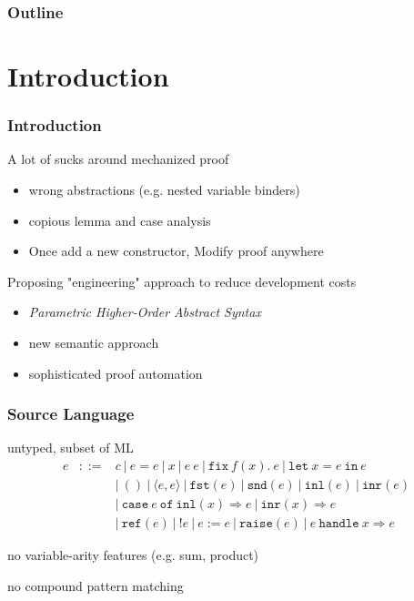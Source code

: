 \documentclass[dvipdfmx,cjk,xcolor=dvipsnames,envcountsect,notheorems,aspectratio=169]{beamer}
\theoremstyle{definition}
\newcommand{\FIX}{\texttt{fix}}
\newcommand{\LET}{\texttt{let}}
\newcommand{\IN}{\texttt{in}}
\newcommand{\FST}{\texttt{fst}}
\newcommand{\SND}{\texttt{snd}}
\newcommand{\INL}{\texttt{inl}}
\newcommand{\INR}{\texttt{inr}}
\newcommand{\CASE}{\texttt{case}}
\newcommand{\OF}{\texttt{of}}
\newcommand{\REF}{\texttt{ref}}
\newcommand{\RAISE}{\texttt{raise}}
\newcommand{\HANDLE}{\texttt{handle}}
\begin{document}
\begin{frame}
  \frametitle{Outline}
  \tableofcontents[sectionstyle=show,subsectionstyle=hide]
\end{frame}

\section{Introduction}

\begin{frame}
	\frametitle{Introduction}
	\LARGE A lot of sucks around mechanized proof
	\begin{itemize}
		\item wrong abstractions (e.g. nested variable binders)
		\item copious lemma and case analysis
		\item Once add a new constructor, Modify proof anywhere
	\end{itemize}

	\vfill

	Proposing "engineering" approach to reduce development costs
	\begin{itemize}
		\item {\it Parametric Higher-Order Abstract Syntax}
		\item new semantic approach
		\item sophisticated proof automation
	\end{itemize}
\end{frame}

\begin{frame}
	\frametitle{Source Language}
	\LARGE untyped, subset of ML
	{\Large \[
		\begin{array}{lcl}
			e & ::= & c~|~e=e~|~x~|~e~e~|~\FIX~f(x).~e~|~\LET~x=e~\IN~e \\
				&     & |~()~|~\langle e,e\rangle~|~\FST(e)~|~\SND(e)~|~\INL(e)~|~\INR(e) \\
				&     & |~\CASE~e~\OF~\INL(x)\Rightarrow e~|~\INR(x)\Rightarrow e \\
				&     & |~\REF(e)~|~!e~|~e := e~|~\RAISE(e)~|~e~\HANDLE~x\Rightarrow e
		\end{array}
	\]}

	no variable-arity features (e.g. sum, product)

	no compound pattern matching
\end{frame}
\end{document}
